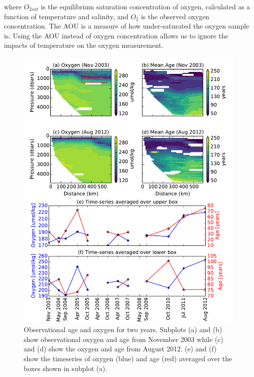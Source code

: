 where $O_{2 sat}$ is the equilibrium saturation concentration of oxygen,
calculated as a function of temperature and salinity, and $O_2$ is the observed
oxygen concentration. The AOU is a measure of how under-saturated the oxygen sample
is. Using the AOU instead of oxygen concentration allows us to ignore the impacts
of temperature on the oxygen measurement.


\begin{figure}
\centering
\includegraphics[width=\linewidth]{age_oxygen_ts.pdf}
\caption{Observational age and oxygen for two years. Subplots (a) and (b) show observational oxygen and
age from November 2003 while (c) and (d) show the oxygen and age from August 2012.
(e) and (f) show the timeseries of oxygen (blue) and age (red) averaged over the
boxes shown in subplot (a).}
\label{fig:obs_age_oxygen}
\end{figure}

